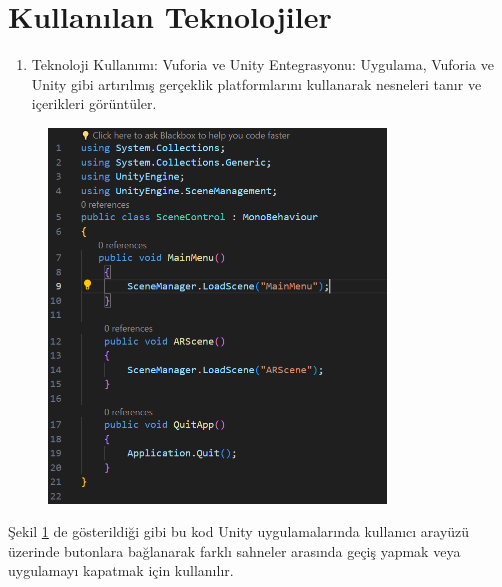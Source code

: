 \documentclass[12pt, a4paper]{article}
\begin{document}
	
	
	
	\section{Kullanılan Teknolojiler}
	\begin{enumerate}
		\item Teknoloji Kullanımı:
		Vuforia ve Unity Entegrasyonu: Uygulama, Vuforia ve Unity gibi artırılmış gerçeklik platformlarını kullanarak nesneleri tanır ve içerikleri görüntüler.
		
	\end{enumerate}
	\newpage
	\begin{figure}[!ht]
		\caption{}
		\centering
		\includegraphics[width=0.8\textwidth]{dinoAR.PNG}
		
		\label{dinoo}
	\end{figure}
	Şekil \ref{dinoo} de gösterildiği gibi bu kod Unity uygulamalarında kullanıcı arayüzü üzerinde butonlara bağlanarak farklı sahneler arasında geçiş yapmak veya uygulamayı kapatmak için kullanılır.\cite{GitHub}
	\newpage
\end{document}
